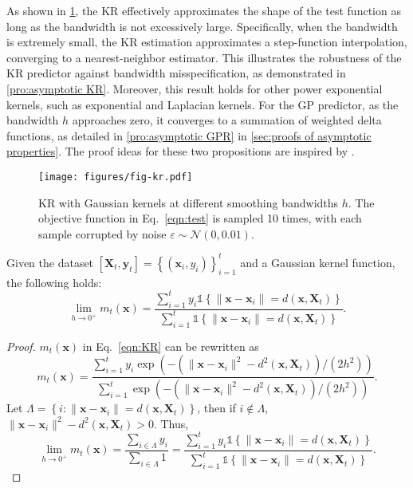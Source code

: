 \documentclass[11pt,en]{elegantpaper}
\newcommand{\X}{\bm{X}}
\newcommand{\x}{\bm{x}}
\newcommand{\y}{\bm{y}}
\newcommand{\1}{\mathds{1}}
\newcommand{\set}[1]{\left\{#1\right\}}
\begin{document}
As shown in \cref{fig:kr}, the KR effectively approximates the shape of the test function as long as the bandwidth is not excessively large. Specifically, when the bandwidth is extremely small, the KR estimation approximates a step-function interpolation, converging to a nearest-neighbor estimator. This illustrates the robustness of the KR predictor against bandwidth misspecification, as demonstrated in \cref{pro:asymptotic KR}. Moreover, this result holds for other power exponential kernels, such as exponential and Laplacian kernels.
For the GP predictor, as the bandwidth $h$ approaches zero, it converges to a summation of weighted delta functions, as detailed in \cref{pro:asymptotic GPR} in \cref{sec:proofs of asymptotic properties}. The proof ideas for these two propositions are inspired by \cite{kang2016kernel}.


\begin{figure}[H]
    \centering
    \texttt{[image: figures/fig-kr.pdf]}
    \caption{KR with Gaussian kernels at different smoothing bandwidths $h$. The objective function in Eq.~\eqref{eqn:test} is sampled 10 times, with each sample corrupted by noise $\varepsilon \sim \mathcal{N}(0, 0.01)$.}
    \label{fig:kr}
\end{figure}


\begin{proposition}
    \label{pro:asymptotic KR}
    Given the dataset $[\X_t, \y_t] = \set{(\x_i, y_i)}_{i=1}^{t}$ and a Gaussian kernel function, the following holds:
    \begin{equation}
        \label{eqn:KR extended}
        \lim_{h \to 0^+} m_t(\x)
        = \dfrac{\sum_{i=1}^{t} y_i \1{\set{\|\x - \x_i\| = d(\x, \X_t)}}}{\sum_{i=1}^{t} \1{\set{\|\x - \x_i\| = d(\x, \X_t)}}}.
    \end{equation}
\end{proposition}

\begin{proof}
    $m_t(\x)$ in Eq.~\eqref{eqn:KR} can be rewritten as
    \[
        m_t(\x) = \dfrac{\sum_{i=1}^{t} y_i \exp\left(- \left(\|\x - \x_i\|^2 - d^2(\x, \X_t)\right) / (2h^2) \right)}{\sum_{i=1}^{t} \exp\left(- \left(\|\x - \x_i\|^2 - d^2(\x, \X_t)\right) / (2h^2) \right)}.
    \]
    Let $\Lambda = \set{i: \|\x - \x_i\| = d(\x, \X_t)}$, then if $i \notin \Lambda$, $\|\x - \x_i\|^2 - d^2(\x, \X_t) > 0$.
    Thus,
    \[
        \lim_{h \to 0^+} m_t(\x)
        = \dfrac{\sum_{i\in \Lambda} y_i}{\sum_{i\in \Lambda} 1}
        = \dfrac{\sum_{i=1}^{t} y_i \1{\set{\|\x - \x_i\| = d(\x, \X_t)}}}{\sum_{i=1}^{t} \1{\set{\|\x - \x_i\| = d(\x, \X_t)}}}.
    \]
\end{proof}
\end{document}
